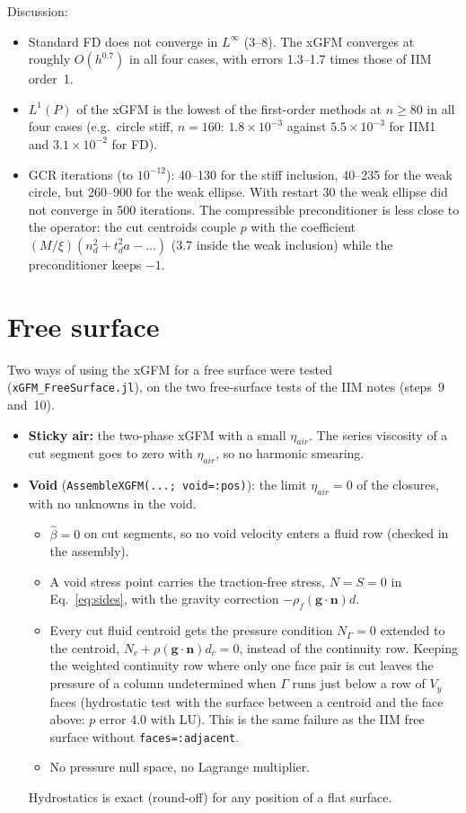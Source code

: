 \documentclass[11pt,a4paper]{article}
\newcommand{\code}[1]{\texttt{#1}}
\begin{document}
\noindent Discussion:
\begin{itemize}
  \item Standard FD does not converge in $L^\infty$ (3--8). The xGFM converges at roughly
    $O(h^{0.7})$ in all four cases, with errors 1.3--1.7 times those of IIM order~1.
  \item $L^1(P)$ of the xGFM is the lowest of the first-order methods at $n\ge80$ in all four
    cases (e.g.\ circle stiff, $n=160$: $1.8\times10^{-3}$ against $5.5\times10^{-3}$ for IIM1 and
    $3.1\times10^{-2}$ for FD).
  \item GCR iterations (to $10^{-12}$): 40--130 for the stiff inclusion, 40--235 for the weak
    circle, but 260--900 for the weak ellipse. With restart 30 the weak ellipse did not converge
    in 500 iterations. The compressible preconditioner is less close to the operator: the cut
    centroids couple $p$ with the coefficient $(M/\xi)(n_d^2+t_d^2a-\ldots)$ (3.7 inside the weak
    inclusion) while the preconditioner keeps $-1$.
\end{itemize}

\section{Free surface}\label{sec:fs}

Two ways of using the xGFM for a free surface were tested (\code{xGFM\_FreeSurface.jl}), on
the two free-surface tests of the IIM notes (steps~9 and~10).
\begin{itemize}
  \item \textbf{Sticky air:} the two-phase xGFM with a small $\eta_{air}$. The series viscosity
    of a cut segment goes to zero with $\eta_{air}$, so no harmonic smearing.
  \item \textbf{Void} (\code{AssembleXGFM(...; void=:pos)}): the limit $\eta_{air}=0$ of the
    closures, with no unknowns in the void.
    \begin{itemize}
      \item $\hat\beta=0$ on cut segments, so no void velocity enters a fluid row (checked in
        the assembly).
      \item A void stress point carries the traction-free stress, $N=S=0$ in
        Eq.~\eqref{eq:sides}, with the gravity correction $-\rho_f(\mathbf g\cdot\mathbf n)d$.
      \item Every cut fluid centroid gets the pressure condition $N_\Gamma=0$ extended to the
        centroid, $N_c+\rho(\mathbf g\cdot\mathbf n)d_c=0$, instead of the continuity row.
        Keeping the weighted continuity row where only one face pair is cut leaves the pressure
        of a column undetermined when $\Gamma$ runs just below a row of $V_y$ faces
        (hydrostatic test with the surface between a centroid and the face above: $p$ error 4.0
        with LU). This is the same failure as the IIM free surface without
        \code{faces=:adjacent}.
      \item No pressure null space, no Lagrange multiplier.
    \end{itemize}
    Hydrostatics is exact (round-off) for any position of a flat surface.
\end{itemize}
\end{document}
